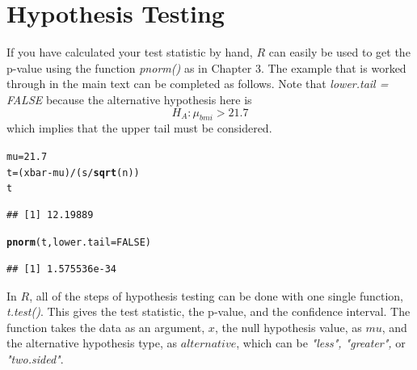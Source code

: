 \documentclass{report}\usepackage[]{graphicx}\usepackage[]{color}
\makeatletter
\newcommand{\hlnum}[1]{\textcolor[rgb]{0.686,0.059,0.569}{#1}}%
\newcommand{\hlopt}[1]{\textcolor[rgb]{0,0,0}{#1}}%
\newcommand{\hlstd}[1]{\textcolor[rgb]{0.345,0.345,0.345}{#1}}%
\newcommand{\hlkwb}[1]{\textcolor[rgb]{0.69,0.353,0.396}{#1}}%
\newcommand{\hlkwc}[1]{\textcolor[rgb]{0.333,0.667,0.333}{#1}}%
\newcommand{\hlkwd}[1]{\textcolor[rgb]{0.737,0.353,0.396}{\textbf{#1}}}%
\newenvironment{kframe}{%
 \def\at@end@of@kframe{}%
 \ifinner\ifhmode%
  \def\at@end@of@kframe{\end{minipage}}%
  \begin{minipage}{\columnwidth}%
 \fi\fi%
 \def\FrameCommand##1{\hskip\@totalleftmargin \hskip-\fboxsep
 \colorbox{shadecolor}{##1}\hskip-\fboxsep
     \hskip-\linewidth \hskip-\@totalleftmargin \hskip\columnwidth}%
 \MakeFramed {\advance\hsize-\width
   \@totalleftmargin\z@ \linewidth\hsize
   \@setminipage}}%
 {\par\unskip\endMakeFramed%
 \at@end@of@kframe}
\newenvironment{knitrout}{}{} %
\makeatother
\begin{document}
\section{Hypothesis Testing}
If you have calculated your test statistic by hand, $R$ can easily be used to get the p-value using the function \textit{pnorm()} as in Chapter 3.  The example that is worked through in the main text can be completed as follows.  Note that \textit{lower.tail = FALSE} because the alternative hypothesis here is 
\[ H_A: \mu_{bmi} > 21.7 \]
which implies that the upper tail must be considered.  
\begin{knitrout}
\color{fgcolor}\begin{kframe}
\begin{alltt}
\hlstd{mu} \hlkwb{=} \hlnum{21.7}
\hlstd{t} \hlkwb{=} \hlstd{(xbar} \hlopt{-} \hlstd{mu)}\hlopt{/}\hlstd{(s}\hlopt{/}\hlkwd{sqrt}\hlstd{(n))}
\hlstd{t}
\end{alltt}
\begin{verbatim}
## [1] 12.19889
\end{verbatim}
\begin{alltt}
\hlkwd{pnorm}\hlstd{(t,} \hlkwc{lower.tail} \hlstd{=} \hlnum{FALSE}\hlstd{)}
\end{alltt}
\begin{verbatim}
## [1] 1.575536e-34
\end{verbatim}
\end{kframe}
\end{knitrout}

In $R$, all of the steps of hypothesis testing can be done with one single function, \textit{t.test()}.  This gives the test statistic, the p-value, and the confidence interval.  The function takes the data as an argument, $x$, the null hypothesis value, as $mu$, and the alternative hypothesis type, as $alternative$, which can be \textit{"less", "greater",} or \textit{"two.sided"}.  
\end{document}
